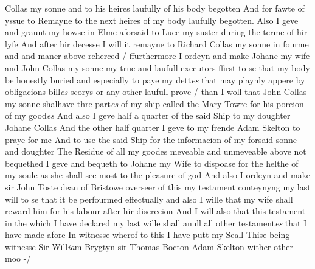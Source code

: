 \documentclass[a4paper,12pt]{article}
\begin{document}
\begin{landscape}
Collas my sonne and to his heires laufully of his body begotten And for fawte of yssue to\newline 
Remayne to the next heires of my body laufully begotten. Also I geve and graunt my howse\newline 
in Elme aforsaid to Luce my suster during the terme of hir lyfe And after hir decesse I will\newline 
it remayne to Richard Collas my sonne in fourme and and maner above reherced / ffurthermore\newline 
I ordeyn and make Johane my wife and John Collas my sonne my true and laufull executors\newline 
ffirst to se that my body be honestly buried and especially to paye my dett\textit{es} that may playnly\newline
appere by obligacions bill\textit{es} scorys or any other laufull prove / than I woll that John Collas\newline 
my sonne shalhave thre part\textit{es} of my ship called the Mary Towre for his porcion of my good\textit{es}\newline 
And also I geve half a quarter of the said Ship to my doughter Johane Collas And the\newline 
other half quarter I geve to my frende Adam Skelton to praye for me And to use the said\newline 
Ship for the informacion of my forsaid sonne and doughter The Residue of all my goodes\newline 
meveable and unmeveable above not bequethed I geve and bequeth to Johane my Wife to\newline 
dispoase for the helthe of my soule as she shall see most to the pleasure of god And also I ordeyn\newline 
and make sir John Toste dean of Bristowe overseer of this my testament conteynyng my\newline 
last will to se that it be perfourmed effectually and also I wille that my wife shall reward\newline 
him for his labour after hir discrecion And I will also that this testament in the which I\newline 
have declared my last wille shall anull all other testament\textit{es} that I have made afore In\newline 
witnesse wherof to this I have putt my Seall Thise being witnesse Sir Will\textit{ia}m Brygtyn\newline 
sir Thomas Bocton Adam Skelton wither other moo -/




\end{landscape}
\end{document}
